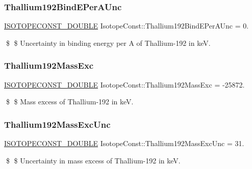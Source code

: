 \subsubsection{\texorpdfstring{Thallium192\+Bind\+E\+Per\+A\+Unc}{Thallium192BindEPerAUnc}}
{\footnotesize\ttfamily \mbox{\hyperlink{group___isotope_const-_macros_ga8f45a7272ce02c0b4c65c44636ed719a}{I\+S\+O\+T\+O\+P\+E\+C\+O\+N\+S\+T\+\_\+\+D\+O\+U\+B\+LE}} Isotope\+Const\+::\+Thallium192\+Bind\+E\+Per\+A\+Unc = 0.}

\$ \$ Uncertainty in binding energy per A of Thallium-\/192 in keV. \mbox{\label{group___isotope_const-_thallium-_tl192_ga18d1367218447ec6738cbbc82fc80db6}} 
\subsubsection{\texorpdfstring{Thallium192\+Mass\+Exc}{Thallium192MassExc}}
{\footnotesize\ttfamily \mbox{\hyperlink{group___isotope_const-_macros_ga8f45a7272ce02c0b4c65c44636ed719a}{I\+S\+O\+T\+O\+P\+E\+C\+O\+N\+S\+T\+\_\+\+D\+O\+U\+B\+LE}} Isotope\+Const\+::\+Thallium192\+Mass\+Exc = -\/25872.}

\$ \$ Mass excess of Thallium-\/192 in keV. \mbox{\label{group___isotope_const-_thallium-_tl192_gaeaceb0668f72bd97828841fdc299e0e1}} 
\subsubsection{\texorpdfstring{Thallium192\+Mass\+Exc\+Unc}{Thallium192MassExcUnc}}
{\footnotesize\ttfamily \mbox{\hyperlink{group___isotope_const-_macros_ga8f45a7272ce02c0b4c65c44636ed719a}{I\+S\+O\+T\+O\+P\+E\+C\+O\+N\+S\+T\+\_\+\+D\+O\+U\+B\+LE}} Isotope\+Const\+::\+Thallium192\+Mass\+Exc\+Unc = 31.}

\$ \$ Uncertainty in mass excess of Thallium-\/192 in keV. \mbox{\label{group___isotope_const-_thallium-_tl192_ga536673082f8c0e47069b079d8fa1af32}} 
